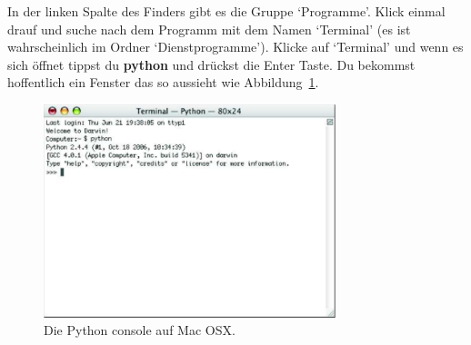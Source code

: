 \begin{MAC}
In der linken Spalte des Finders gibt es die Gruppe `Programme'. Klick einmal drauf und suche nach dem Programm mit dem Namen `Terminal' (es ist wahrscheinlich im Ordner `Dienstprogramme').
Klicke auf `Terminal' und wenn es sich öffnet tippst du \textbf{python} und drückst die Enter Taste. Du bekommst hoffentlich ein Fenster das so aussieht wie Abbildung~\ref{fig3}.


\begin{figure}
\begin{center}
\includegraphics[width=85mm]{images/figure3}
\end{center}
\caption{Die Python console auf Mac OSX.}\label{fig3}
\end{figure}
\end{MAC}

